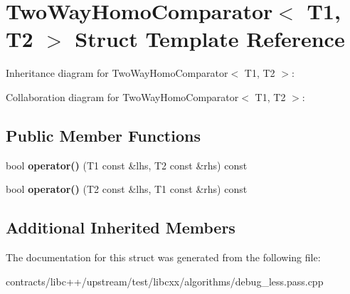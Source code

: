 \hypertarget{struct_two_way_homo_comparator}{}\section{Two\+Way\+Homo\+Comparator$<$ T1, T2 $>$ Struct Template Reference}
\label{struct_two_way_homo_comparator}


Inheritance diagram for Two\+Way\+Homo\+Comparator$<$ T1, T2 $>$\+:


Collaboration diagram for Two\+Way\+Homo\+Comparator$<$ T1, T2 $>$\+:
\subsection*{Public Member Functions}
\begin{DoxyCompactItemize}
\item 
\mbox{\label{struct_two_way_homo_comparator_a5a98ebe08fb706860176e08e377f34ed}} 
bool {\bfseries operator()} (T1 const \&lhs, T2 const \&rhs) const
\item 
\mbox{\label{struct_two_way_homo_comparator_ad5c469278422b441ab20a041c32a22b4}} 
bool {\bfseries operator()} (T2 const \&lhs, T1 const \&rhs) const
\end{DoxyCompactItemize}
\subsection*{Additional Inherited Members}


The documentation for this struct was generated from the following file\+:\begin{DoxyCompactItemize}
\item 
contracts/libc++/upstream/test/libcxx/algorithms/debug\+\_\+less.\+pass.\+cpp\end{DoxyCompactItemize}
